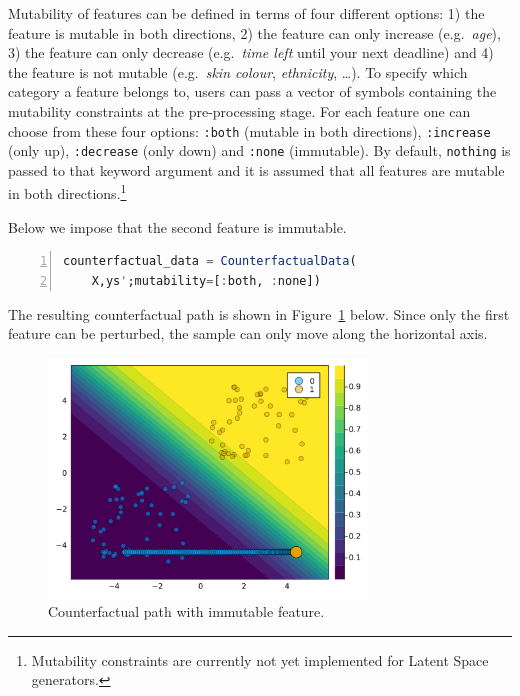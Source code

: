 \documentclass[
  letterpaper,
  DIV=11,
  numbers=noendperiod]{scrartcl}
\begin{document}
Mutability of features can be defined in terms of four different
options: 1) the feature is mutable in both directions, 2) the feature
can only increase (e.g.~\emph{age}), 3) the feature can only decrease
(e.g.~\emph{time left} until your next deadline) and 4) the feature is
not mutable (e.g.~\emph{skin colour}, \emph{ethnicity}, \ldots). To
specify which category a feature belongs to, users can pass a vector of
symbols containing the mutability constraints at the pre-processing
stage. For each feature one can choose from these four options:
\texttt{:both} (mutable in both directions), \texttt{:increase} (only
up), \texttt{:decrease} (only down) and \texttt{:none} (immutable). By
default, \texttt{nothing} is passed to that keyword argument and it is
assumed that all features are mutable in both directions.\footnote{Mutability
  constraints are currently not yet implemented for Latent Space
  generators.}

Below we impose that the second feature is immutable.

\begin{lstlisting}[language=Julia, escapechar=@, numbers=left, label={lst:mutability}, caption={}]
counterfactual_data = CounterfactualData(
    X,ys';mutability=[:both, :none])
\end{lstlisting}

The resulting counterfactual path is shown in
Figure~\ref{fig-mutability} below. Since only the first feature can be
perturbed, the sample can only move along the horizontal axis.

\begin{figure}

{\centering \includegraphics[width=3.33333in,height=2.5in]{www/constraint_mutability.png}

}

\caption{\label{fig-mutability}Counterfactual path with immutable
feature.}

\end{figure}
\end{document}
